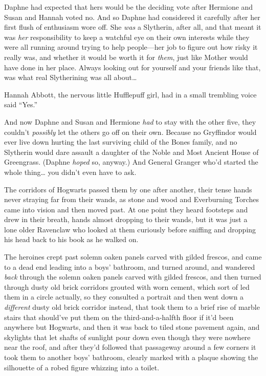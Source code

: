 Daphne had expected that hers would be the deciding vote after Hermione
and Susan and Hannah voted no. And so Daphne had considered it carefully
after her first flush of enthusiasm wore off. She \emph{was} a
Slytherin, after all, and that meant it was \emph{her} responsibility to
keep a watchful eye on their own interests while they were all running
around trying to help people---her job to figure out how risky it really
was, and whether it would be worth it for \emph{them}, just like Mother
would have done in her place. Always looking out for yourself and your
friends like that, was what real Slytherining was all about\ldots{}

Hannah Abbott, the nervous little Hufflepuff girl, had in a small
trembling voice said ``Yes.''

And now Daphne and Susan and Hermione \emph{had} to stay with the other
five, they couldn't \emph{possibly} let the others go off on their own.
Because no Gryffindor would ever live down hurting the last surviving
child of the Bones family, and no Slytherin would dare assault a
daughter of the Noble and Most Ancient House of Greengrass. (Daphne
\emph{hoped} so, anyway.) And General Granger who'd started the whole
thing\ldots{} you didn't even have to ask.

The corridors of Hogwarts passed them by one after another, their tense
hands never straying far from their wands, as stone and wood and
Everburning Torches came into vision and then moved past. At one point
they heard footsteps and drew in their breath, hands almost dropping to
their wands, but it was just a lone older Ravenclaw who looked at them
curiously before sniffing and dropping his head back to his book as he
walked on.

The heroines crept past solemn oaken panels carved with gilded frescos,
and came to a dead end leading into a boys' bathroom, and turned around,
and wandered \emph{back} through the solemn oaken panels carved with
gilded frescos, and then turned through dusty old brick corridors
grouted with worn cement, which sort of led them in a circle actually,
so they consulted a portrait and then went down a \emph{different} dusty
old brick corridor instead, that took them to a brief rise of marble
stairs that should've put them on the third-and-a-halfth floor if it'd
been anywhere but Hogwarts, and then it was back to tiled stone pavement
again, and skylights that let shafts of sunlight pour down even though
they were nowhere near the roof, and after they'd followed that
passageway around a few corners it took them to another boys' bathroom,
clearly marked with a plaque showing the silhouette of a robed figure
whizzing into a toilet.

